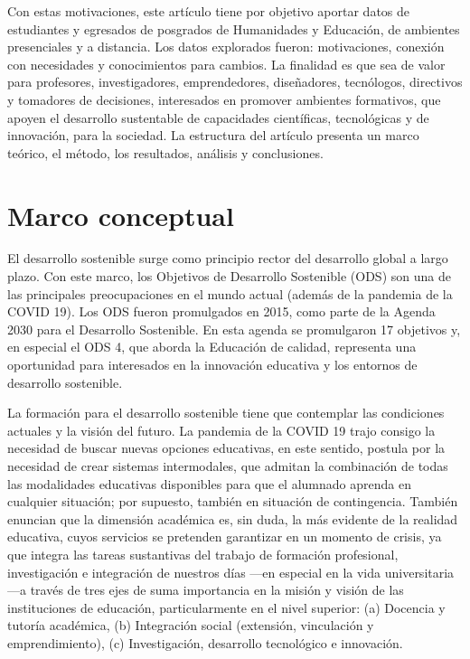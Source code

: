 \documentclass[spanish]{textolivre}
\begin{document}
Con estas motivaciones, este artículo tiene por objetivo aportar datos de estudiantes y egresados de posgrados de Humanidades y Educación, de ambientes presenciales y a distancia. Los datos explorados fueron: motivaciones, conexión con necesidades y conocimientos para cambios. La finalidad es que sea de valor para profesores, investigadores, emprendedores, diseñadores, tecnólogos, directivos y tomadores de decisiones, interesados en promover ambientes formativos, que apoyen el desarrollo sustentable de capacidades científicas, tecnológicas y de innovación, para la sociedad. La estructura del artículo presenta un marco teórico, el método, los resultados, análisis y conclusiones. 

\section{Marco conceptual}\label{sec-normas}
El desarrollo sostenible surge como principio rector del desarrollo global a largo plazo. Con este marco, los Objetivos de Desarrollo Sostenible (ODS) son una de las principales preocupaciones en el mundo actual (además de la pandemia de la COVID 19). Los ODS fueron promulgados en 2015, como parte de la Agenda 2030 para el Desarrollo Sostenible. En esta agenda se promulgaron 17 objetivos y, en especial el ODS 4, que aborda la Educación de calidad, representa una oportunidad para interesados en la innovación educativa y los entornos de desarrollo sostenible.

La formación para el desarrollo sostenible tiene que contemplar las condiciones actuales y la visión del futuro. La pandemia de la COVID 19 trajo consigo la necesidad de buscar nuevas opciones educativas, en este sentido, \textcite{escudero-nahon_metasintesis_2021} postula por la necesidad de crear sistemas intermodales, que admitan la combinación de todas las modalidades educativas disponibles para que el alumnado aprenda en cualquier situación; por supuesto, también en situación de contingencia. También \textcite{vicario-solorzano_dimensiones_2021} enuncian que la dimensión académica es, sin duda, la más evidente de la realidad educativa, cuyos servicios se pretenden garantizar en un momento de crisis, ya que integra las tareas sustantivas del trabajo de formación profesional, investigación e integración de nuestros días —en especial en la vida universitaria—a través de tres ejes de suma importancia en la misión y visión de las instituciones de educación, particularmente en el nivel superior: (a) Docencia y tutoría académica, (b) Integración social (extensión, vinculación y emprendimiento), (c) Investigación, desarrollo tecnológico e innovación.
\end{document}
